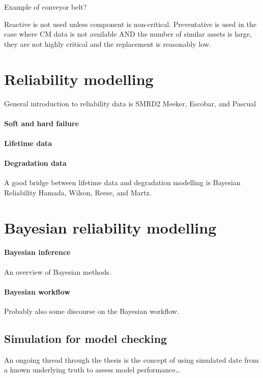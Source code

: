 Example of conveyor belt? 

Reactive is not used unless component is non-critical. Preventative is used in the case where CM data is not available AND the number of similar assets is large, they are not highly critical and the replacement is reasonably low.

\section{Reliability modelling}
\label{sec:reliability}
General introduction to reliability data is SMRD2 Meeker, Escobar, and Pascual

\paragraph*{Soft and hard failure}

\paragraph*{Lifetime data}

\paragraph*{Degradation data}
A good bridge between lifetime data and degradation modelling is Bayesian Reliability Hamada, Wilson, Reese, and Martz.

\section{Bayesian reliability modelling}
\label{sec:Bayesian-methods}
\paragraph*{Bayesian inference}
An overview of Bayesian methods.

\paragraph*{Bayesian workflow}
Probably also some discourse on the Bayesian workflow.

\subsection{Simulation for model checking}

An ongoing thread through the thesis is the concept of using simulated date from a known underlying truth to assess model performance\ldots

